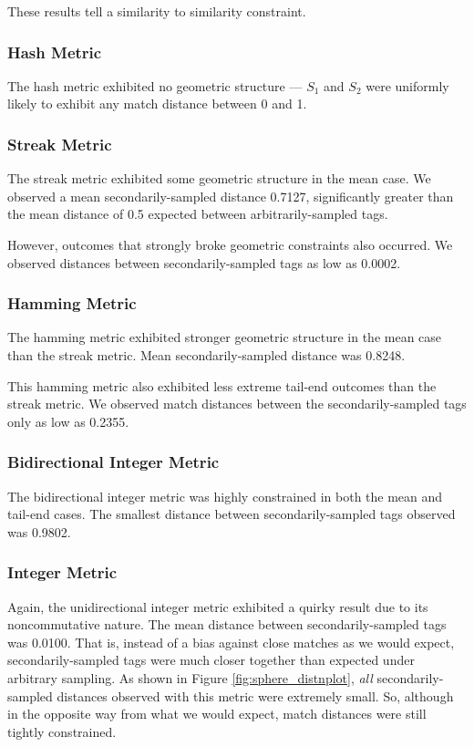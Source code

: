 These results tell a similarity to similarity constraint.

\subsubsection{Hash Metric}
The hash metric exhibited no geometric structure --- $S_1$ and $S_2$ were uniformly likely to exhibit any match distance between 0 and 1.

\subsubsection{Streak Metric}

The streak metric exhibited some geometric structure in the mean case. We observed a mean secondarily-sampled distance 0.7127, significantly greater than the mean distance of 0.5 expected between arbitrarily-sampled tags.

However, outcomes that strongly broke geometric constraints also occurred.
We observed distances between secondarily-sampled tags as low as 0.0002.

\subsubsection{Hamming Metric}

The hamming metric exhibited stronger geometric structure in the mean case than the streak metric.
Mean secondarily-sampled distance was 0.8248.

This hamming metric also exhibited less extreme tail-end outcomes than the streak metric.
We observed match distances between the secondarily-sampled tags only as low as 0.2355.

\subsubsection{Bidirectional Integer Metric}

The bidirectional integer metric was highly constrained in both the mean and tail-end cases.
The smallest distance between secondarily-sampled tags observed was 0.9802.

\subsubsection{Integer Metric}

Again, the unidirectional integer metric exhibited a quirky result due to its noncommutative nature.
The mean distance between secondarily-sampled tags was 0.0100.
That is, instead of a bias against close matches as we would expect, secondarily-sampled tags were much closer together than expected under arbitrary sampling.
As shown in Figure \ref{fig:sphere_distnplot}, \textit{all} secondarily-sampled distances observed with this metric were extremely small.
So, although in the opposite way from what we would expect, match distances were still tightly constrained.

